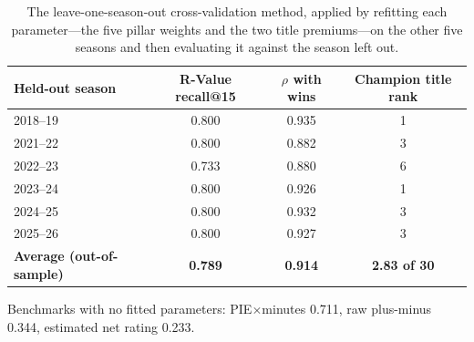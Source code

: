 \documentclass[11pt]{article}
\begin{document}
\begin{table}[h]
\centering
\caption{The leave-one-season-out cross-validation method, applied by refitting
each parameter---the five pillar weights and the two title premiums---on the
other five seasons and then evaluating it against the season left out.}
\small
\begin{tabular}{lccc}
\toprule
Held-out season & R-Value recall@15 & $\rho$ with wins & Champion title rank \\
\midrule
2018--19 & 0.800 & 0.935 & 1 \\
2021--22 & 0.800 & 0.882 & 3 \\
2022--23 & 0.733 & 0.880 & 6 \\
2023--24 & 0.800 & 0.926 & 1 \\
2024--25 & 0.800 & 0.932 & 3 \\
2025--26 & 0.800 & 0.927 & 3 \\
\midrule
\textbf{Average (out-of-sample)} & \textbf{0.789} & \textbf{0.914} & \textbf{2.83 of 30} \\
\bottomrule
\end{tabular}

\vspace{5pt}
{\small Benchmarks with no fitted parameters: PIE$\times$minutes 0.711, raw
plus-minus 0.344, estimated net rating 0.233.}
\end{table}
\end{document}
